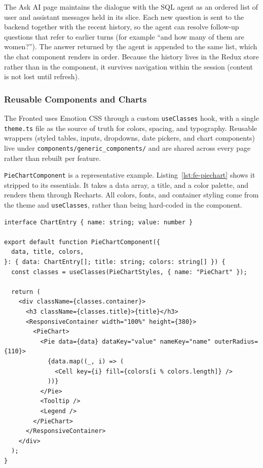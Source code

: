 The Ask AI page maintains the dialogue with the SQL agent as an ordered list of user and assistant messages held in its slice. Each new question is sent to the backend together with the recent history, so the agent can resolve follow-up questions that refer to earlier turns (for example ``and how many of them are women?''). The answer returned by the agent is appended to the same list, which the chat component renders in order. Because the history lives in the Redux store rather than in the component, it survives navigation within the session (content is not lost until refresh).

\subsubsection*{Reusable Components and Charts}

The Fronted uses Emotion CSS through a custom \texttt{useClasses} hook, with a single \texttt{theme.ts} file as the source of truth for colors, spacing, and typography. Reusable wrappers (styled tables, inputs, dropdowns, date pickers, and chart components) live under \texttt{components/generic\_components/} and are shared across every page rather than rebuilt per feature.

\texttt{PieChartComponent} is a representative example. Listing~\ref{lst:fe-piechart} shows it stripped to its essentials. It takes a data array, a title, and a color palette, and renders them through Recharts. All colors, fonts, and container styling come from the theme and \texttt{useClasses}, rather than being hard-coded in the component.

\begin{lstlisting}[style=tsxstyle, caption={Simplified reusable pie-chart component}, label={lst:fe-piechart}]
interface ChartEntry { name: string; value: number }

export default function PieChartComponent({
  data, title, colors,
}: { data: ChartEntry[]; title: string; colors: string[] }) {
  const classes = useClasses(PieChartStyles, { name: "PieChart" });

  return (
    <div className={classes.container}>
      <h3 className={classes.title}>{title}</h3>
      <ResponsiveContainer width="100%" height={380}>
        <PieChart>
          <Pie data={data} dataKey="value" nameKey="name" outerRadius={110}>
            {data.map((_, i) => (
              <Cell key={i} fill={colors[i % colors.length]} />
            ))}
          </Pie>
          <Tooltip />
          <Legend />
        </PieChart>
      </ResponsiveContainer>
    </div>
  );
}
\end{lstlisting}


